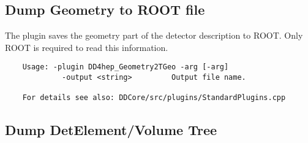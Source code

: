 \subsection{Dump Geometry to ROOT file}
\label{sec:dd4hep-manual-plugin-save-geometry-root}

The plugin saves the geometry part of the detector description to ROOT.
Only ROOT is required to read this information.
\begin{verbatim}
    Usage: -plugin DD4hep_Geometry2TGeo -arg [-arg]
             -output <string>         Output file name.

    For details see also: DDCore/src/plugins/StandardPlugins.cpp
\end{verbatim}

\subsection{Dump DetElement/Volume Tree}
\label{sec:dd4hep-manual-plugin-dump-detelement-volume-tree}

